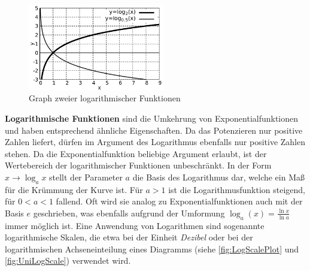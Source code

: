 \begin{minipage}[t]{1\textwidth}
    \begin{figure}
        \centering
        \includegraphics[width=6cm]{./gnuplot/base-function-log}
        \caption{Graph zweier logarithmischer Funktionen}
        \label{fig:ExBaseFunLog}
    \end{figure}
    \textbf{Logarithmische Funktionen} sind die Umkehrung von Exponentialfunktionen und haben entsprechend ähnliche Eigenschaften. Da das Potenzieren nur positive Zahlen liefert, dürfen im Argument des Logarithmus ebenfalls nur positive Zahlen stehen. Da die Exponentialfunktion beliebige Argument erlaubt, ist der Wertebereich der logarithmischer Funktionen unbeschränkt. In der Form $x \to \log_a{x}$ stellt der Parameter $a$ die Basis des Logarithmus dar, welche ein Maß für die Krümmung der Kurve ist. Für $a>1$ ist die Logarithmusfunktion steigend, für $0<a<1$ fallend. Oft wird sie analog zu Exponentialfunktionen auch mit der Basis $e$ geschrieben, was ebenfalls aufgrund der Umformung $\log_a(x) = \frac{\ln x}{\ln a}$ immer möglich ist. Eine Anwendung von Logarithmen sind sogenannte logarithmische Skalen, die etwa bei der Einheit \emph{Dezibel} oder bei der logarithmischen Achseneinteilung eines Diagramms (siehe \ref{fig:LogScalePlot} und \ref{fig:UniLogScale}) verwendet wird.
\end{minipage}

